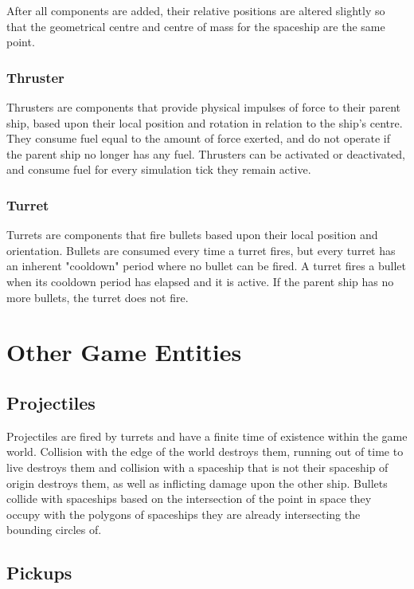 \documentclass[a4paper]{article}
\begin{document}
After all components are added, their relative positions are altered slightly so that the geometrical centre and centre of mass for the spaceship are the same point.

\subsubsection{Thruster}

Thrusters are components that provide physical impulses of force to their parent ship, based upon their local position and rotation in relation to the ship's centre. They consume fuel equal to the amount of force exerted, and do not operate if the parent ship no longer has any fuel. Thrusters can be activated or deactivated, and consume fuel for every simulation tick they remain active.

\subsubsection{Turret}

Turrets are components that fire bullets based upon their local position and orientation. Bullets are consumed every time a turret fires, but every turret has an inherent "cooldown" period where no bullet can be fired. A turret fires a bullet when its cooldown period has elapsed and it is active. If the parent ship has no more bullets, the turret does not fire.
		
\section{Other Game Entities}

\subsection{Projectiles}

Projectiles are fired by turrets and have a finite time of existence within the game world. Collision with the edge of the world destroys them, running out of time to live destroys them and collision with a spaceship that is not their spaceship of origin destroys them, as well as inflicting damage upon the other ship. Bullets collide with spaceships based on the intersection of the point in space they occupy with the polygons of spaceships they are already intersecting the bounding circles of.

\subsection{Pickups}
\end{document}
